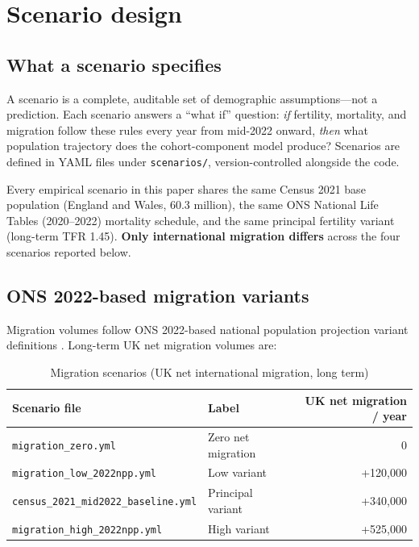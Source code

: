 \documentclass[12pt,a4paper]{article}
\begin{document}
\section{Scenario design}

\subsection{What a scenario specifies}

A scenario is a complete, auditable set of demographic assumptions---not a prediction.
Each scenario answers a ``what if'' question: \emph{if} fertility, mortality, and migration
follow these rules every year from mid-2022 onward, \emph{then} what population trajectory
does the cohort-component model produce? Scenarios are defined in YAML files under
\texttt{scenarios/}, version-controlled alongside the code.

Every empirical scenario in this paper shares the same Census 2021 base population (England
and Wales, 60.3 million), the same ONS National Life Tables (2020--2022) mortality schedule,
and the same principal fertility variant (long-term TFR 1.45). \textbf{Only international
migration differs} across the four scenarios reported below.

\subsection{ONS 2022-based migration variants}

Migration volumes follow ONS 2022-based national population projection variant definitions
\citep{ons2024nppmigration, ons2024nppvariants}. Long-term UK net migration volumes are:

\begin{table}[H]
\centering
\caption{Migration scenarios (UK net international migration, long term)}
\label{tab:migration_scenarios}
\begin{tabular}{llr}
\toprule
\textbf{Scenario file} & \textbf{Label} & \textbf{UK net migration / year} \\
\midrule
\texttt{migration\_zero.yml} & Zero net migration & 0 \\
\texttt{migration\_low\_2022npp.yml} & Low variant & +120,000 \\
\texttt{census\_2021\_mid2022\_baseline.yml} & Principal variant & +340,000 \\
\texttt{migration\_high\_2022npp.yml} & High variant & +525,000 \\
\bottomrule
\end{tabular}
\end{table}
\end{document}
